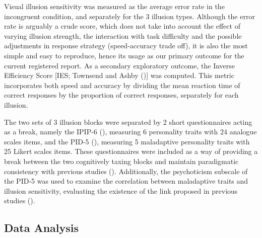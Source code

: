 \documentclass[
  man,
  floatsintext,
  longtable,
  nolmodern,
  notxfonts,
  notimes,
  colorlinks=true,linkcolor=blue,citecolor=blue,urlcolor=blue]{apa7}
\begin{document}
Visual illusion sensitivity was measured as the average error rate in
the incongruent condition, and separately for the 3 illusion types.
Although the error rate is arguably a crude score, which does not take
into account the effect of varying illusion strength, the interaction
with task difficulty and the possible adjustments in response strategy
(speed-accuracy trade off), it is also the most simple and easy to
reproduce, hence its usage as our primary outcome for the current
registered report. As a secondary exploratory outcome, the Inverse
Efficiency Score {[}IES; Townsend and Ashby
(){]} was computed. This metric
incorporates both speed and accuracy by dividing the mean reaction time
of correct responses by the proportion of correct responses, separately
for each illusion.

The two sets of 3 illusion blocks were separated by 2 short
questionnaires acting as a break, namely the IPIP-6
(), measuring 6
personality traits with 24 analogue scales items, and the PID-5
(), measuring 5
maladaptive personality traits with 25 Likert scales items. These
questionnaires were included as a way of providing a break between the
two cognitively taxing blocks and maintain paradigmatic consistency with
previous studies ().
Additionally, the psychoticism subscale of the PID-5 was used to examine
the correlation between maladaptive traits and illusion sensitivity,
evaluating the existence of the link proposed in previous studies
().

\subsection{Data Analysis}\label{data-analysis}
\end{document}
